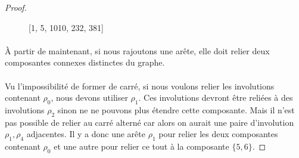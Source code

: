 \begin{proof}
\begin{figure}[H]
  \begin{center}
    \caption{[1, 5, 1010, 232, 381]}
  \end{center}
\end{figure}

\paragraph{}
À partir de maintenant, si nous rajoutons une arête, elle doit relier deux composantes connexes distinctes du graphe.

\paragraph{}
Vu l'impossibilité de former de carré, si nous voulons relier les involutions contenant $\rho_0$, nous devons utiliser $\rho_1$. Ces involutions devront être reliées à des involutions $\rho_2$ sinon ne ne pouvons plus étendre cette composante. Mais il n'est pas possible de relier au carré alterné car alors on aurait une paire d'involution $\rho_1, \rho_4$ adjacentes. Il y a donc une arête $\rho_1$ pour relier les deux composantes contenant $\rho_0$ et une autre pour relier ce tout à la composante $\{5,6\}$.


\end{proof}
